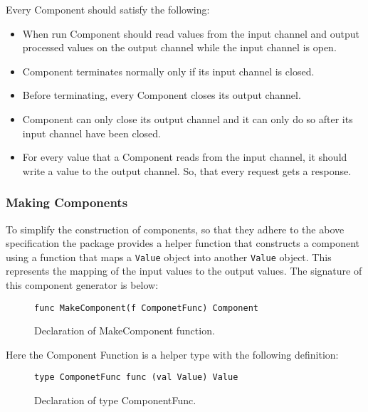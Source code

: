 \documentclass[12pt,a4paper]{article}
\begin{document}
Every Component should satisfy the following:
\begin{itemize}
    \item When run Component should read values from the input channel
		  and output processed values on the output channel while the input 
		  channel is open.

    \item Component terminates normally only if its input channel is closed.

    \item Before terminating, every Component closes its output channel.

    \item Component can only close its output channel and it can only do so
    	  after its input channel have been closed.

    \item For every value that a Component reads from the input channel, 
		  it should write a value to the output channel. So, that every request 
		  gets a response.
  
\end{itemize}

\subsubsection{Making Components}
To simplify the construction of components, so that they adhere to 
the above specification the package provides a helper function that 
constructs a component using a function that maps a \texttt{Value} object 
into another \texttt{Value} object. This represents the mapping of the
input values to the output values.
The signature of this component generator is below:

\begin{figure}[h]
\centering
\begin{lstlisting}
func MakeComponent(f ComponetFunc) Component
\end{lstlisting}
\caption[scale=1.0]{Declaration of MakeComponent function.}
\label{fig:MakeComponent}
\end{figure}

Here the Component Function is a helper type with the following definition:

\begin{figure}[h]
\centering
\begin{lstlisting}
type ComponetFunc func (val Value) Value
\end{lstlisting}
\caption[scale=1.0]{Declaration of type ComponentFunc.}
\label{fig:ComponentFunc}
\end{figure}
\end{document}
